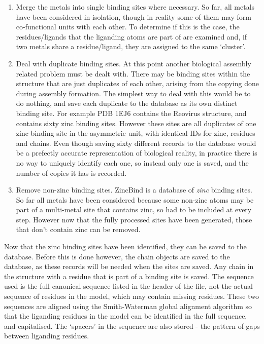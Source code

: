 \begin{enumerate}
   \item Merge the metals into single binding sites where necessary. So far, all metals have been considered in isolation, though in reality some of them may form co-functional units with each other. To determine if this is the case, the residues/ligands that the liganding atoms are part of are examined and, if two metals share a residue/ligand, they are assigned to the same `cluster'.
   \item Deal with duplicate binding sites. At this point another biological assembly related problem must be dealt with. There may be binding sites within the structure that are just duplicates of each other, arising from the copying done during assembly formation. The simplest way to deal with this would be to do nothing, and save each duplicate to the database as its own distinct binding site. For example PDB 1EJ6 contains the Reovirus structure, and contains sixty zinc binding sites. However these sites are all duplicates of one zinc binding site in the asymmetric unit, with identical IDs for zinc, residues and chains. Even though saving sixty different records to the database would be a prefectly accurate representation of biological reality, in practice there is no way to uniquely identify each one, so instead only one is saved, and the number of copies it has is recorded.
   \item Remove non-zinc binding sites. ZincBind is a database of \emph{zinc} binding sites. So far all metals have been considered because some non-zinc atoms may be part of a multi-metal site that contains zinc, so had to be included at every step. However now that the fully processed sites have been generated, those that don't contain zinc can be removed.
\end{enumerate}

Now that the zinc binding sites have been identified, they can be saved to the database. Before this is done however, the chain objects are saved to the database, as these records will be needed when the sites are saved. Any chain in the structure with a residue that is part of a binding site is saved. The sequence used is the full canonical sequence listed in the header of the file, not the actual sequence of residues in the model, which may contain missing residues. These two sequences are aligned using the Smith-Waterman global alignment algorithm  so that the liganding residues in the model can be identified in the full sequence, and capitalised. The `spacers' in the sequence are also stored - the pattern of gaps between liganding residues.

